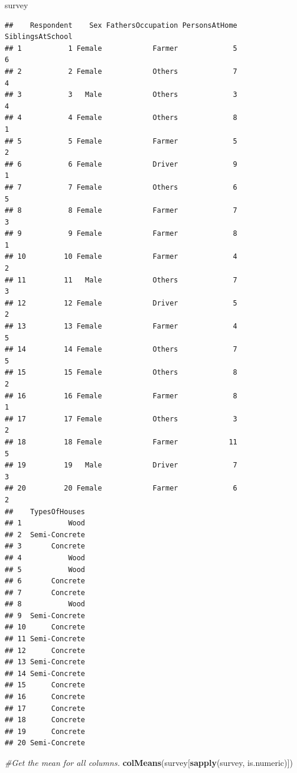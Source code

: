 \documentclass[
]{article}
\newenvironment{Shaded}{\begin{snugshade}}{\end{snugshade}}
\newcommand{\CommentTok}[1]{\textcolor[rgb]{0.56,0.35,0.01}{\textit{#1}}}
\newcommand{\FunctionTok}[1]{\textcolor[rgb]{0.13,0.29,0.53}{\textbf{#1}}}
\newcommand{\NormalTok}[1]{#1}
\begin{document}
\begin{Shaded}
\begin{Highlighting}[]
\NormalTok{survey}
\end{Highlighting}
\end{Shaded}

\begin{verbatim}
##    Respondent    Sex FathersOccupation PersonsAtHome SiblingsAtSchool
## 1           1 Female            Farmer             5                6
## 2           2 Female            Others             7                4
## 3           3   Male            Others             3                4
## 4           4 Female            Others             8                1
## 5           5 Female            Farmer             5                2
## 6           6 Female            Driver             9                1
## 7           7 Female            Others             6                5
## 8           8 Female            Farmer             7                3
## 9           9 Female            Farmer             8                1
## 10         10 Female            Farmer             4                2
## 11         11   Male            Others             7                3
## 12         12 Female            Driver             5                2
## 13         13 Female            Farmer             4                5
## 14         14 Female            Others             7                5
## 15         15 Female            Others             8                2
## 16         16 Female            Farmer             8                1
## 17         17 Female            Others             3                2
## 18         18 Female            Farmer            11                5
## 19         19   Male            Driver             7                3
## 20         20 Female            Farmer             6                2
##    TypesOfHouses
## 1           Wood
## 2  Semi-Concrete
## 3       Concrete
## 4           Wood
## 5           Wood
## 6       Concrete
## 7       Concrete
## 8           Wood
## 9  Semi-Concrete
## 10      Concrete
## 11 Semi-Concrete
## 12      Concrete
## 13 Semi-Concrete
## 14 Semi-Concrete
## 15      Concrete
## 16      Concrete
## 17      Concrete
## 18      Concrete
## 19      Concrete
## 20 Semi-Concrete
\end{verbatim}

\begin{Shaded}
\begin{Highlighting}[]
\CommentTok{\#Get the mean for all columns.}
\FunctionTok{colMeans}\NormalTok{(survey[}\FunctionTok{sapply}\NormalTok{(survey, is.numeric)])}
\end{Highlighting}
\end{Shaded}
\end{document}
